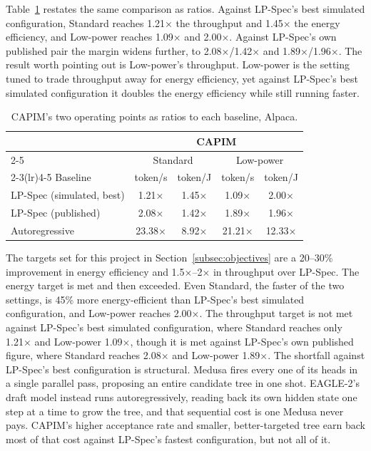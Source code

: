 \documentclass[11pt]{article}
\begin{document}
Table~\ref{tab:headline_ratio} restates the same comparison as ratios. Against LP-Spec's best simulated configuration, Standard reaches 1.21× the throughput and 1.45× the energy efficiency, and Low-power reaches 1.09× and 2.00×. Against LP-Spec's own published pair the margin widens further, to 2.08×/1.42× and 1.89×/1.96×. The result worth pointing out is Low-power's throughput. Low-power is the setting tuned to trade throughput away for energy efficiency, yet against LP-Spec's best simulated configuration it doubles the energy efficiency while still running faster.

\begin{table}[H]
\centering
\footnotesize
\begin{tabular}{lcccc}
\toprule
 & \multicolumn{4}{c}{CAPIM} \\
\cmidrule(lr){2-5}
 & \multicolumn{2}{c}{Standard} & \multicolumn{2}{c}{Low-power} \\
\cmidrule(lr){2-3}\cmidrule(lr){4-5}
Baseline & token/s & token/J & token/s & token/J \\
\midrule
LP-Spec (simulated, best) & 1.21×  & 1.45× & 1.09×  & 2.00×  \\
LP-Spec (published)       & 2.08×  & 1.42× & 1.89×  & 1.96×  \\
Autoregressive            & 23.38× & 8.92× & 21.21× & 12.33× \\
\bottomrule
\end{tabular}
\caption{CAPIM's two operating points as ratios to each baseline, Alpaca.}
\label{tab:headline_ratio}
\end{table}

The targets set for this project in Section~\ref{subsec:objectives} are a 20--30\% improvement in energy efficiency and 1.5×--2× in throughput over LP-Spec. The energy target is met and then exceeded. Even Standard, the faster of the two settings, is 45\% more energy-efficient than LP-Spec's best simulated configuration, and Low-power reaches 2.00×. The throughput target is not met against LP-Spec's best simulated configuration, where Standard reaches only 1.21× and Low-power 1.09×, though it is met against LP-Spec's own published figure, where Standard reaches 2.08× and Low-power 1.89×. The shortfall against LP-Spec's best configuration is structural. Medusa fires every one of its heads in a single parallel pass, proposing an entire candidate tree in one shot. EAGLE-2's draft model instead runs autoregressively, reading back its own hidden state one step at a time to grow the tree, and that sequential cost is one Medusa never pays. CAPIM's higher acceptance rate and smaller, better-targeted tree earn back most of that cost against LP-Spec's fastest configuration, but not all of it.
\end{document}
